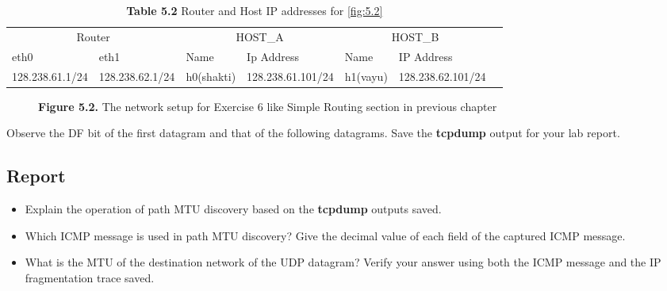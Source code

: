 \documentclass{../UTNetLab}
\begin{document}
	\begin{table}[H]
        \caption{\textbf{Table 5.2} Router and Host IP addresses for \autoref{fig:5.2}}
        \vspace{5pt}
        \centering
        \large
        \begin{tabular}{ *7l }
            \hline \hline
            \multicolumn{2}{c}{Router} & \multicolumn{2}{c}{HOST\_A} & \multicolumn{2}{c}{HOST\_B} \\
            eth0 & eth1 & Name & Ip Address & Name & IP Address \\
            \hline 
            128.238.61.1/24 & 128.238.62.1/24 & h0(shakti) & 128.238.61.101/24 & h1(vayu) & 128.238.62.101/24 \\
            \hline \hline
            \end{tabular}
    \end{table}

    \begin{figure}[H]
        \centering
        \caption{\textbf{Figure 5.2.} The network setup for Exercise 6 like Simple Routing section in previous chapter}
		\label{fig:5.2}
    \end{figure}

	Observe the DF bit of the first datagram and that of the following datagrams. Save the \textbf{tcpdump} output for your lab report.\\

	\subsection*{Report}
	\begin{itemize}
		\item Explain the operation of path MTU discovery based on the \textbf{tcpdump} outputs saved.
		\item Which ICMP message is used in path MTU discovery? Give the decimal value of each field of the captured ICMP message.
		\item What is the MTU of the destination network of the UDP datagram? Verify your answer using both the ICMP message and the IP fragmentation trace saved.
	\end{itemize}
\end{document}
